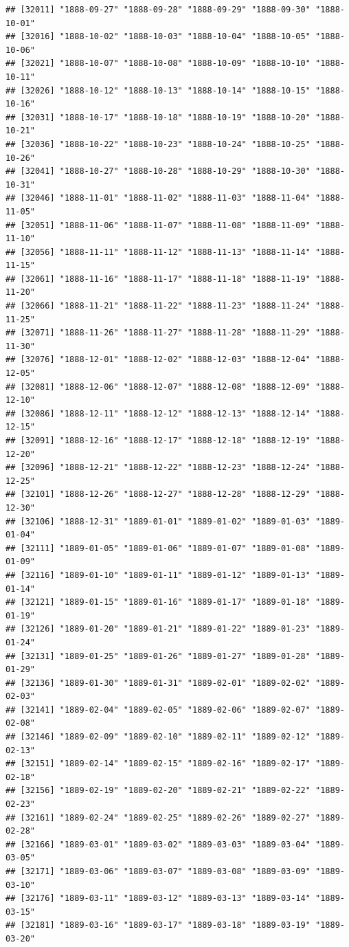 \documentclass{article}\usepackage[]{graphicx}\usepackage[]{color}
\makeatletter
\newenvironment{kframe}{%
 \def\at@end@of@kframe{}%
 \ifinner\ifhmode%
  \def\at@end@of@kframe{\end{minipage}}%
  \begin{minipage}{\columnwidth}%
 \fi\fi%
 \def\FrameCommand##1{\hskip\@totalleftmargin \hskip-\fboxsep
 \colorbox{shadecolor}{##1}\hskip-\fboxsep
     \hskip-\linewidth \hskip-\@totalleftmargin \hskip\columnwidth}%
 \MakeFramed {\advance\hsize-\width
   \@totalleftmargin\z@ \linewidth\hsize
   \@setminipage}}%
 {\par\unskip\endMakeFramed%
 \at@end@of@kframe}
\newenvironment{knitrout}{}{} %
\makeatother
\begin{document}
\begin{description}
\begin{knitrout}
\begin{kframe}
\begin{verbatim}
## [32011] "1888-09-27" "1888-09-28" "1888-09-29" "1888-09-30" "1888-10-01"
## [32016] "1888-10-02" "1888-10-03" "1888-10-04" "1888-10-05" "1888-10-06"
## [32021] "1888-10-07" "1888-10-08" "1888-10-09" "1888-10-10" "1888-10-11"
## [32026] "1888-10-12" "1888-10-13" "1888-10-14" "1888-10-15" "1888-10-16"
## [32031] "1888-10-17" "1888-10-18" "1888-10-19" "1888-10-20" "1888-10-21"
## [32036] "1888-10-22" "1888-10-23" "1888-10-24" "1888-10-25" "1888-10-26"
## [32041] "1888-10-27" "1888-10-28" "1888-10-29" "1888-10-30" "1888-10-31"
## [32046] "1888-11-01" "1888-11-02" "1888-11-03" "1888-11-04" "1888-11-05"
## [32051] "1888-11-06" "1888-11-07" "1888-11-08" "1888-11-09" "1888-11-10"
## [32056] "1888-11-11" "1888-11-12" "1888-11-13" "1888-11-14" "1888-11-15"
## [32061] "1888-11-16" "1888-11-17" "1888-11-18" "1888-11-19" "1888-11-20"
## [32066] "1888-11-21" "1888-11-22" "1888-11-23" "1888-11-24" "1888-11-25"
## [32071] "1888-11-26" "1888-11-27" "1888-11-28" "1888-11-29" "1888-11-30"
## [32076] "1888-12-01" "1888-12-02" "1888-12-03" "1888-12-04" "1888-12-05"
## [32081] "1888-12-06" "1888-12-07" "1888-12-08" "1888-12-09" "1888-12-10"
## [32086] "1888-12-11" "1888-12-12" "1888-12-13" "1888-12-14" "1888-12-15"
## [32091] "1888-12-16" "1888-12-17" "1888-12-18" "1888-12-19" "1888-12-20"
## [32096] "1888-12-21" "1888-12-22" "1888-12-23" "1888-12-24" "1888-12-25"
## [32101] "1888-12-26" "1888-12-27" "1888-12-28" "1888-12-29" "1888-12-30"
## [32106] "1888-12-31" "1889-01-01" "1889-01-02" "1889-01-03" "1889-01-04"
## [32111] "1889-01-05" "1889-01-06" "1889-01-07" "1889-01-08" "1889-01-09"
## [32116] "1889-01-10" "1889-01-11" "1889-01-12" "1889-01-13" "1889-01-14"
## [32121] "1889-01-15" "1889-01-16" "1889-01-17" "1889-01-18" "1889-01-19"
## [32126] "1889-01-20" "1889-01-21" "1889-01-22" "1889-01-23" "1889-01-24"
## [32131] "1889-01-25" "1889-01-26" "1889-01-27" "1889-01-28" "1889-01-29"
## [32136] "1889-01-30" "1889-01-31" "1889-02-01" "1889-02-02" "1889-02-03"
## [32141] "1889-02-04" "1889-02-05" "1889-02-06" "1889-02-07" "1889-02-08"
## [32146] "1889-02-09" "1889-02-10" "1889-02-11" "1889-02-12" "1889-02-13"
## [32151] "1889-02-14" "1889-02-15" "1889-02-16" "1889-02-17" "1889-02-18"
## [32156] "1889-02-19" "1889-02-20" "1889-02-21" "1889-02-22" "1889-02-23"
## [32161] "1889-02-24" "1889-02-25" "1889-02-26" "1889-02-27" "1889-02-28"
## [32166] "1889-03-01" "1889-03-02" "1889-03-03" "1889-03-04" "1889-03-05"
## [32171] "1889-03-06" "1889-03-07" "1889-03-08" "1889-03-09" "1889-03-10"
## [32176] "1889-03-11" "1889-03-12" "1889-03-13" "1889-03-14" "1889-03-15"
## [32181] "1889-03-16" "1889-03-17" "1889-03-18" "1889-03-19" "1889-03-20"

\end{verbatim}
\end{kframe}
\end{knitrout}
\end{description}
\end{document}
